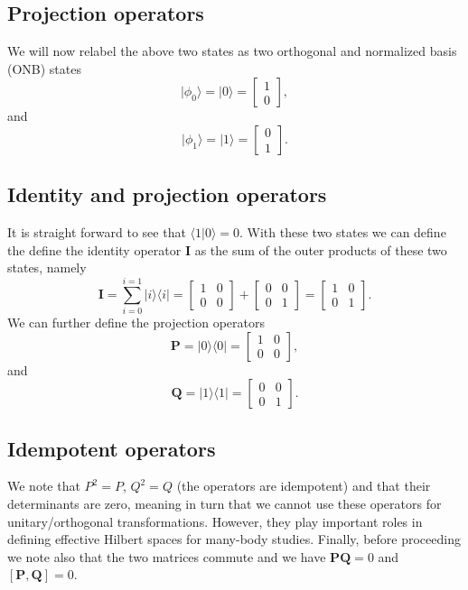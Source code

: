 \subsection{Projection operators}

We will now relabel the above two states as two orthogonal and normalized basis (ONB) states 
\[
\vert \phi_0 \rangle = \vert 0 \rangle = \begin{bmatrix} 1 \\ 0 \end{bmatrix},
\]
and 
\[
\vert \phi_1 \rangle = \vert 1 \rangle = \begin{bmatrix} 0 \\ 1 \end{bmatrix}.
\]

\subsection{Identity and projection operators}

It is straight forward to see that $\langle 1 \vert 0\rangle=0$. With these two states we can define the define the identity operator $\bm{I}$ as the sum of the outer products of these two states, namely
\[
\bm{I} = \sum_{i=0}^{i=1}\vert i\rangle \langle i\vert = \begin{bmatrix} 1 & 0 \\ 0 & 0 \end{bmatrix} +\begin{bmatrix} 0 & 0 \\ 0 & 1 \end{bmatrix}=\begin{bmatrix} 1 & 0 \\ 0 & 1 \end{bmatrix}.
\]
We can further define the projection operators
\[
\bm{P} = \vert 0\rangle \langle 0\vert = \begin{bmatrix} 1 & 0 \\ 0 & 0 \end{bmatrix},
\]
and 
\[
\bm{Q} = \vert 1\rangle \langle 1\vert = \begin{bmatrix} 0 & 0 \\ 0 & 1 \end{bmatrix}.
\]

\subsection{Idempotent operators}

We note that $P^2=P$, $Q^2=Q$ (the operators are idempotent) and that
their determinants are zero, meaning in turn that we cannot use these
operators for unitary/orthogonal transformations. However, they play
important roles in defining effective Hilbert spaces for many-body
studies. Finally, before proceeding we note also that the two matrices
commute and we have $\bm{P}\bm{Q}=0$ and $\left[ \bm{P},\bm{Q}\right]=0$.

